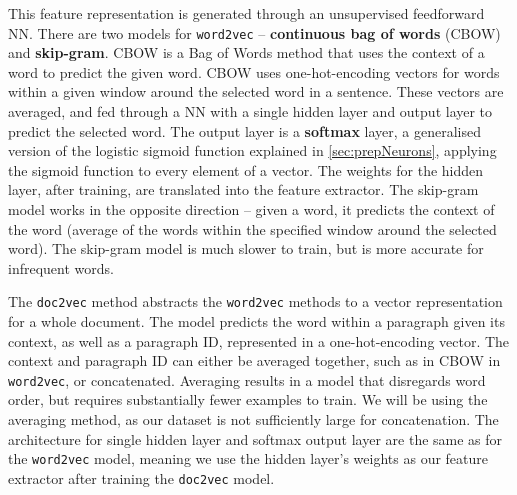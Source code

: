\documentclass[12pt,a4paper,twoside,openright]{report}
\begin{document}
This feature representation is generated through an unsupervised feedforward NN. There
are two models for \texttt{word2vec} -- \textbf{continuous bag of words} (CBOW) and \textbf{skip-gram}.
CBOW is a Bag of Words method that uses the context of a word to predict the given word.
CBOW uses one-hot-encoding vectors
for words within a given window around the selected word in a sentence. These vectors are averaged,
and fed through a NN with a single hidden layer 
and output layer to predict the selected word. The output layer is a \textbf{softmax}
layer, a generalised version of the logistic sigmoid function explained in \cref{sec:prepNeurons},
applying the sigmoid function to every element of a vector.
The weights for the hidden layer, after training, are translated into the feature extractor.
The skip-gram model works in the opposite
direction -- given a word, it predicts the
context of the word (average of the words within the specified window around the selected word).
The skip-gram model is much slower to train, but is more accurate for infrequent words.

The \texttt{doc2vec} method abstracts the \texttt{word2vec} methods to a vector representation
for a whole document. The model predicts the word within a paragraph given its context, as well
as a paragraph ID, represented in a one-hot-encoding vector. The context and paragraph ID can
either be averaged together, such as in CBOW in \texttt{word2vec}, or concatenated. Averaging
results in a model that disregards word order, but requires substantially fewer
examples to train. We will be using the averaging method, as our dataset is not sufficiently
large for concatenation. The architecture for single hidden layer and softmax output layer are
the same as for the \texttt{word2vec} model, meaning we use the hidden layer's weights as our
feature extractor after training the \texttt{doc2vec} model.
\end{document}
